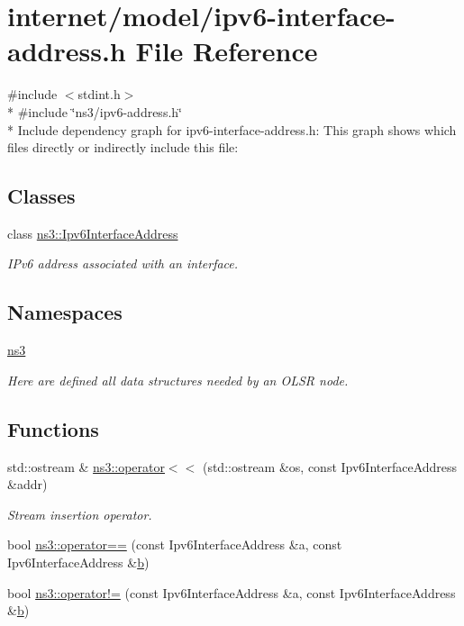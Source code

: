 \hypertarget{ipv6-interface-address_8h}{}\section{internet/model/ipv6-\/interface-\/address.h File Reference}
\label{ipv6-interface-address_8h}
{\ttfamily \#include $<$stdint.\+h$>$}\\*
{\ttfamily \#include \char`\"{}ns3/ipv6-\/address.\+h\char`\"{}}\\*
Include dependency graph for ipv6-\/interface-\/address.h\+:
This graph shows which files directly or indirectly include this file\+:
\subsection*{Classes}
\begin{DoxyCompactItemize}
\item 
class \hyperlink{classns3_1_1Ipv6InterfaceAddress}{ns3\+::\+Ipv6\+Interface\+Address}
\begin{DoxyCompactList}\small\item\em I\+Pv6 address associated with an interface. \end{DoxyCompactList}\end{DoxyCompactItemize}
\subsection*{Namespaces}
\begin{DoxyCompactItemize}
\item 
 \hyperlink{namespacens3}{ns3}
\begin{DoxyCompactList}\small\item\em Here are defined all data structures needed by an O\+L\+SR node. \end{DoxyCompactList}\end{DoxyCompactItemize}
\subsection*{Functions}
\begin{DoxyCompactItemize}
\item 
std\+::ostream \& \hyperlink{namespacens3_aad980a26c3c4bc66a2922e83624a88e3}{ns3\+::operator$<$$<$} (std\+::ostream \&os, const Ipv6\+Interface\+Address \&addr)
\begin{DoxyCompactList}\small\item\em Stream insertion operator. \end{DoxyCompactList}\item 
bool \hyperlink{namespacens3_a9e0f5a2afedfcf09ecef132b775ffaad}{ns3\+::operator==} (const Ipv6\+Interface\+Address \&a, const Ipv6\+Interface\+Address \&\hyperlink{lte__pathloss_8m_a21ad0bd836b90d08f4cf640b4c298e7c}{b})
\item 
bool \hyperlink{namespacens3_acff9ee55cf01e0e2440b879ad88d9a80}{ns3\+::operator!=} (const Ipv6\+Interface\+Address \&a, const Ipv6\+Interface\+Address \&\hyperlink{lte__pathloss_8m_a21ad0bd836b90d08f4cf640b4c298e7c}{b})
\end{DoxyCompactItemize}
